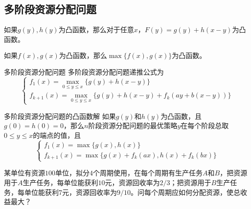 \documentclass[lang = cn, scheme = chinese, thmcnt = section]{elegantbook}
\newcommand{\dis}{\displaystyle}
\begin{document}
\subsection{多阶段资源分配问题}

\begin{lemma}
	如果$g(y),h(y)$为凸函数，那么对于任意$x$，$F(y)=g(y)+h(x-y)$为凸函数。
\end{lemma}

\begin{lemma}
	如果$f(x),g(x)$为凸函数，那么$\max\{f(x),g(x)\}$为凸函数。
\end{lemma}

\begin{theorem}{多阶段资源分配问题}
	多阶段资源分配问题递推公式为%
	$$
	\begin{cases}
		\dis f_1(x)=\max_{0\le y \le x}\{ g(y)+h(x-y) \}\\
		\dis f_{k+1}(x)=\max_{0\le y \le x}\{ g(y)+h(x-y)+f_{k}(ay+b(x-y)) \}
	\end{cases}
	$$
\end{theorem}

\begin{theorem}{多阶段资源分配问题的凸函数解}
	如果$g(y)$和$h(y)$为凸函数，且$g(0)=h(0)=0$，那么$n$阶段资源分配问题的最优策略$y$在每个阶段总取$0\le y \le x$的端点的值，且%
	$$
	\begin{cases}
		f_1(x)=\max\{ g(x),h(x) \}\\
		f_{k+1}(x)=\max\{ g(x)+f_k(ax),h(x)+f_k(bx) \}
	\end{cases}
	$$
\end{theorem}

\begin{example}
	某单位有资源$100$单位，拟分$4$个周期使用，在每个周期有生产任务$A$和$B$，把资源用于$A$生产任务，每单位能获利$10$元，资源回收率为$2/3$；把资源用于$B$生产任务，每单位能获利$7$元，资源回收率为$9/10$​。问每个周期应如何分配资源，使总收益最大？
\end{example}
\end{document}
